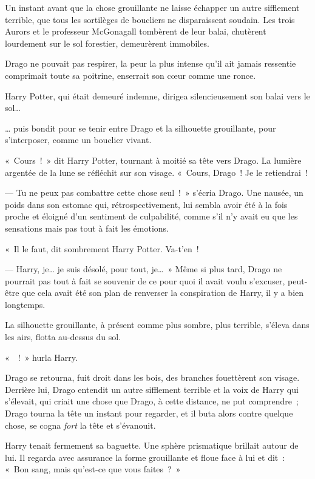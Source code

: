 \begin{em}
Un instant avant que la chose grouillante ne laisse échapper un autre sifflement terrible, que tous les sortilèges de boucliers ne disparaissent soudain.
Les trois Aurors et le professeur McGonagall tombèrent de leur balai, chutèrent lourdement sur le sol forestier, demeurèrent immobiles.

Drago ne pouvait pas respirer, la peur la plus intense qu'il ait jamais ressentie comprimait toute sa poitrine, enserrait son cœur comme une ronce.

Harry Potter, qui était demeuré indemne, dirigea silencieusement son balai vers le sol…

… puis bondit pour se tenir entre Drago et la silhouette grouillante, pour s'interposer, comme un bouclier vivant.

«~Cours~!~»
dit Harry Potter, tournant à moitié sa tête vers Drago.
La lumière argentée de la lune se réfléchit sur son visage.
«~Cours, Drago~!
Je le retiendrai~!

--- Tu ne peux pas combattre cette chose seul~!~»
s'écria Drago.
Une nausée, un poids dans son estomac qui, rétrospectivement, lui sembla avoir été à la fois proche et éloigné d'un sentiment de culpabilité, comme s'il n'y avait eu que les sensations mais pas tout à fait les émotions.

«~Il le faut, dit sombrement Harry Potter.
Va-t'en~!

--- Harry, je… je suis désolé, pour tout, je…~»
Même si plus tard, Drago ne pourrait pas tout à fait se souvenir de ce pour quoi il avait voulu s'excuser, peut-être que cela avait été son plan de renverser la conspiration de Harry, il y a bien longtemps.

La silhouette grouillante, à présent comme plus sombre, plus terrible, s'éleva dans les airs, flotta au-dessus du sol.

«~~!~»
hurla Harry.

Drago se retourna, fuit droit dans les bois, des branches fouettèrent son visage.
Derrière lui, Drago entendit un autre sifflement terrible et la voix de Harry qui s'élevait, qui criait une chose que Drago, à cette distance, ne put comprendre~; Drago tourna la tête un instant pour regarder, et il buta alors contre quelque chose, se cogna \emph{fort} la tête et s'évanouit.
\end{em}

\later

Harry tenait fermement sa baguette.
Une sphère prismatique brillait autour de lui.
Il regarda avec assurance la forme grouillante et floue face à lui et dit~: «~Bon sang, mais qu'est-ce que vous faites~?~»


